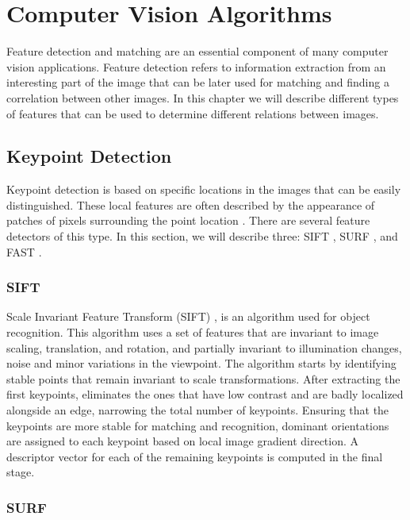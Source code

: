 \section{Computer Vision Algorithms}

Feature detection and matching are an essential component of many computer vision applications. Feature detection refers to information extraction from an interesting part of the image that can be later used for matching and finding a correlation between other images. In this chapter we will describe different types of features that can be used to determine different relations between images.

\subsection{Keypoint Detection}
\label{sub:keypoint}

Keypoint detection is based on specific locations in the images that can be easily distinguished. These local features are often described by the appearance of patches of pixels surrounding the point location \cite{szeliski2011computer}.
There are several feature detectors of this type. In this section, we will describe three: SIFT \cite{lowe1999object}, SURF \cite{bay2006surf}, and FAST \cite{rosten2006machine}.

\subsubsection{SIFT}
\label{subsub:sift}
Scale Invariant Feature Transform (SIFT) \cite{lowe1999object}, is an algorithm used for object recognition. This algorithm uses a set of features that are invariant to image scaling, translation, and rotation, and partially invariant to illumination changes, noise and minor variations in the viewpoint.
The algorithm starts by identifying stable points that remain invariant to scale transformations. After extracting the first keypoints, eliminates the ones that have low contrast and are badly localized alongside an edge, narrowing the total number of keypoints. Ensuring that the keypoints are more stable for matching and recognition, dominant orientations are assigned to each keypoint based on local image gradient direction. A descriptor vector for each of the remaining keypoints is computed in the final stage.

\subsubsection{SURF}
\label{subsub:surf}

